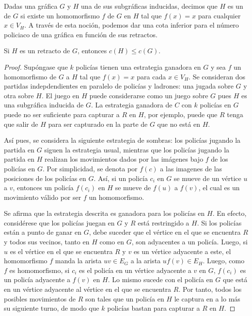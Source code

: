 Dadas una gr\'afica $G$ y $H$ una de sus subgr\'aficas inducidas, decimos que
$H$ es un  de $G$ si existe un homomorfismo $f$ de $G$ en $H$
tal que $f(x)=x$ para cualquier $x\in V_H$. A trav\'es de esta noci\'on, podemos
dar una cota inferior para el n\'umero policiaco de una gr\'afica en funci\'on
de sus retractos.

\newpage

\begin{lema}
\label{lem:retracto-cota}
  Si $H$ es un retracto de $G$, entonces $c(H)\leq c(G)$.  
\end{lema}

\begin{proof}
  Sup\'ongase que $k$ polic\'ias tienen una estrategia ganadora en $G$ y sea $f$
  un homomorfismo de $G$ a $H$ tal que $f(x)=x$ para cada $x\in V_H$. Se
  consideran dos partidas indepdendientes en paralelo de polic\'ias y ladrones:
  una jugada sobre $G$ y otra sobre $H$. El juego en $H$ puede considerarse como
  un juego sobre $G$ pues $H$ es una subgr\'afica inducida de $G$. La estrategia
  ganadora de $C$ con $k$ polic\'ias en $G$ puede no ser suficiente para
  capturar a $R$ en $H$, por ejemplo, puede que $R$ tenga que salir de $H$ para
  ser capturado en la parte de $G$ que no est\'a en $H$.

  As\'i pues, se considera la siguiente estrategia de sombras: los polic\'ias
  jugando la partida en $G$ siguen la estrategia usual, mientras que los
  polic\'ias jugando la partida en $H$ realizan los movimientos dados por las
  im\'agenes bajo $f$ de los polic\'ias en $G$. Por simplicidad, se denota por
  $f(c)$ a las imagenes de las posiciones de los polic\'ias en $G$. As\'i, si un
  polic\'ia $c_i$ en $G$ se mueve de un v\'ertice $u$ a $v$, entonces un
  polic\'ia $f(c_i)$ en $H$ se mueve de $f(u)$ a $f(v)$, el cual es un
  movimiento v\'alido por ser $f$ un homomorfismo.

  Se afirma que la estrategia descrita es ganadora para los polic\'ias en $H$.
  En efecto, consid\'erese que los polic\'ias juegan en $G$ y $R$ est\'a
  restringido a $H$. Si los polic\'ias est\'an a punto de ganar en $G$, debe
  suceder que el v\'ertice en el que se encuentra $R$ y todos sus vecinos, tanto
  en $H$ como en $G$, son adyacentes a un polic\'ia. Luego, si $u$ es el
  v\'ertice en el que se encuentra $R$ y $v$ es un v\'ertice adyacente a este,
  el homomorfismo $f$ manda la arista $uv\in E_G$ a la arista $uf(v)\in E_H$.
  Luego, como $f$ es homomorfismo, si $c_i$ es el polic\'ia en un v\'ertice
  adyacente a $v$ en $G$, $f(c_i)$ es un polic\'ia adyacente a $f(v)$ en $H$. Lo
  mismo sucede con el polic\'ia en $G$ que est\'a en un v\'ertice adyacente al
  v\'ertice en el que se encuentra $R$. Por tanto, todos los posibles
  movimientos de $R$ son tales que un polic\'ia en $H$ le captura en a lo m\'as
  su siguiente turno, de modo que $k$ polic\'ias bastan para capturar a $R$ en
  $H$.

\end{proof}

